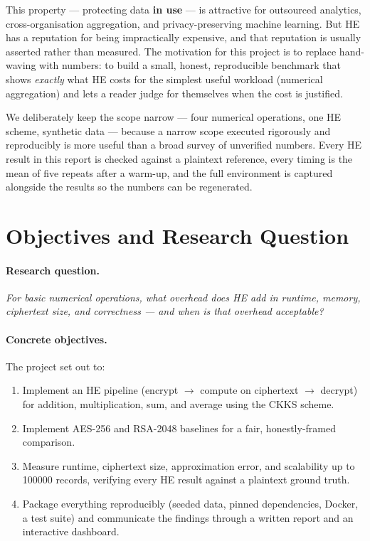 \documentclass[11pt,a4paper]{article}
\begin{document}
This property --- protecting data \textbf{in use} --- is attractive for
outsourced analytics, cross-organisation aggregation, and privacy-preserving
machine learning. But HE has a reputation for being impractically expensive, and
that reputation is usually asserted rather than measured. The motivation for this
project is to replace hand-waving with numbers: to build a small, honest,
reproducible benchmark that shows \emph{exactly} what HE costs for the simplest
useful workload (numerical aggregation) and lets a reader judge for themselves
when the cost is justified.

We deliberately keep the scope narrow --- four numerical operations, one HE
scheme, synthetic data --- because a narrow scope executed rigorously and
reproducibly is more useful than a broad survey of unverified numbers. Every HE
result in this report is checked against a plaintext reference, every timing is
the mean of five repeats after a warm-up, and the full environment is captured
alongside the results so the numbers can be regenerated.

\section{Objectives and Research Question}

\paragraph{Research question.}
\emph{For basic numerical operations, what overhead does HE add in runtime,
memory, ciphertext size, and correctness --- and when is that overhead
acceptable?}

\paragraph{Concrete objectives.} The project set out to:
\begin{enumerate}[leftmargin=1.4em,itemsep=1pt]
  \item Implement an HE pipeline (encrypt $\rightarrow$ compute on ciphertext
    $\rightarrow$ decrypt) for addition, multiplication, sum, and average using
    the CKKS scheme.
  \item Implement AES-256 and RSA-2048 baselines for a fair, honestly-framed
    comparison.
  \item Measure runtime, ciphertext size, approximation error, and scalability
    up to \num{100000} records, verifying every HE result against a plaintext
    ground truth.
  \item Package everything reproducibly (seeded data, pinned dependencies,
    Docker, a test suite) and communicate the findings through a written report
    and an interactive dashboard.
\end{enumerate}
\end{document}
